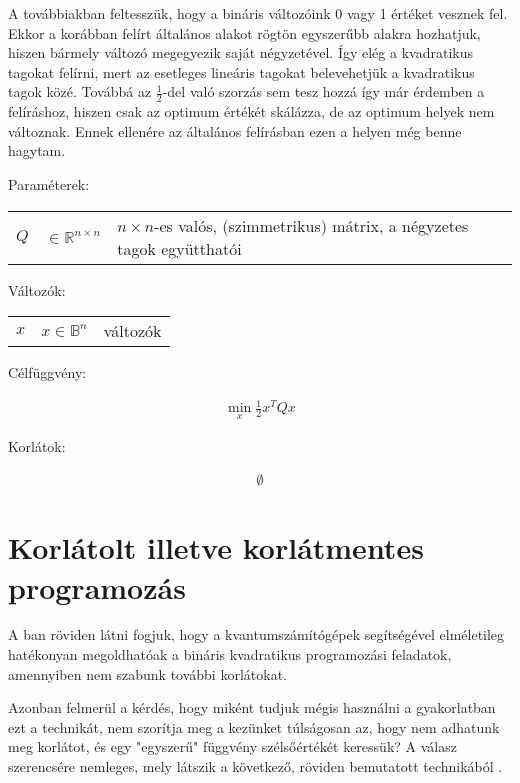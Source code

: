 A továbbiakban feltesszük, hogy a bináris változóink 0 vagy 1 értéket vesznek fel. Ekkor a korábban felírt általános alakot rögtön egyszerűbb alakra hozhatjuk, hiszen bármely változó megegyezik saját négyzetével. Így elég a kvadratikus tagokat felírni, mert az esetleges lineáris tagokat belevehetjük a kvadratikus tagok közé. Továbbá az $\frac{1}{2}$-del való szorzás sem tesz hozzá így már érdemben a felíráshoz, hiszen csak az optimum értékét skálázza, de az optimum helyek nem változnak. Ennek ellenére az általános felírásban ezen a helyen még benne hagytam.

Paraméterek:

\begin{tabular}{lll}
	$Q$ & $\in \mathbb{R}^{n×n}$  & $n × n$-es valós, (szimmetrikus) mátrix, a négyzetes tagok együtthatói \\
\end{tabular}

Változók:

\begin{tabular}{lll}
	$x$ & $x \in \mathbb{B}^n$ & változók \\
\end{tabular}

Célfüggvény:

\begin{align}
	\min_{x} \frac{1}{2} x^T Q x
\end{align}

Korlátok:

\begin{align}
	\emptyset
\end{align}



\section{Korlátolt illetve korlátmentes programozás} \label{sec:constrainedVSunconstrained}

A ban röviden látni fogjuk, hogy a kvantumszámítógépek segítségével elméletileg hatékonyan megoldhatóak a bináris kvadratikus programozási feladatok, amennyiben nem szabunk további korlátokat.

Azonban felmerül a kérdés, hogy miként tudjuk mégis használni a gyakorlatban ezt a technikát, nem szorítja meg a kezünket túlságosan az, hogy nem adhatunk meg korlátot, és egy "egyszerű" függvény szélsőértékét keressük? A válasz szerencsére nemleges, mely látszik a következő, röviden bemutatott technikából \cite{DBLP:journals/corr/abs-1811-11538}. 

